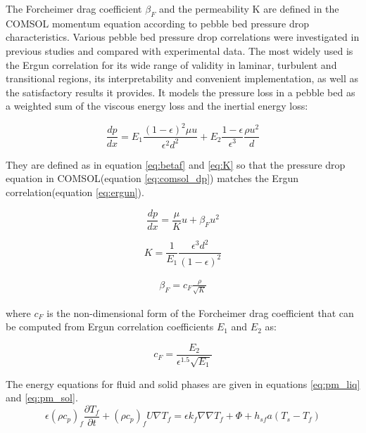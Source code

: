 \documentclass{elsarticle}
\begin{document}
The Forcheimer drag coefficient $\beta_F$ and the permeability K are defined in the COMSOL momentum equation according to pebble bed pressure drop characteristics. 
Various pebble bed pressure drop correlations were investigated in previous studies\cite{Scarlat2012} and compared with experimental data\cite{Kang2010}. The most widely used is the Ergun correlation\cite{Ergun1949} for its wide range of validity in laminar, turbulent and transitional regions, its interpretability and convenient implementation, as well as the satisfactory results it provides. It models the pressure loss in a pebble bed as a weighted sum of the viscous energy loss and the inertial energy loss: 


\begin{equation}
  \frac{dp}{dx} = E_1 \frac{(1-\epsilon)^2\mu u}{\epsilon ^2 d^2} + E_2 \frac{1-\epsilon}{\epsilon^3}\frac{\rho u^2}{d}
  \label{eq:ergun}
\end{equation}



They are defined as in equation \ref{eq:betaf} and \ref{eq:K} so that the pressure drop equation in COMSOL(equation \ref{eq:comsol_dp}) matches the Ergun correlation(equation \ref{eq:ergun}).

\begin{equation}
  \frac{dp}{dx} = \frac{\mu}{K}u + \beta_F u^2
  \label{eq:comsol_dp}
\end{equation}

\begin{equation}
      K = \frac{1}{E_1}\frac{\epsilon^3 d^2}{(1-\epsilon)^2}
      \label{eq:K}
\end{equation}

\begin{align}
  \beta_F = c_F \frac{\rho}{\sqrt{K}}
  \label{eq:betaf}
\end{align}

where $c_F$ is the non-dimensional form of the Forcheimer drag coefficient that can be computed from Ergun correlation coefficients $E_1$ and $E_2$ as:

\begin{equation}
    c_F = \frac{E_2}{\epsilon^{1.5}\sqrt{E_1}}
\end{equation}



The energy equations for fluid and solid phases are given in equations \ref{eq:pm_liq} and \ref{eq:pm_sol}.
\begin{equation}
  \epsilon(\rho c_p)_f \frac{\partial T_f}{\partial t} + (\rho c_p)_f U\nabla T_f = \epsilon k_f \nabla\nabla T_f + \Phi + h_{sf}a(T_s - T_f)
  \label{eq:pm_liq}
\end{equation}
\end{document}
